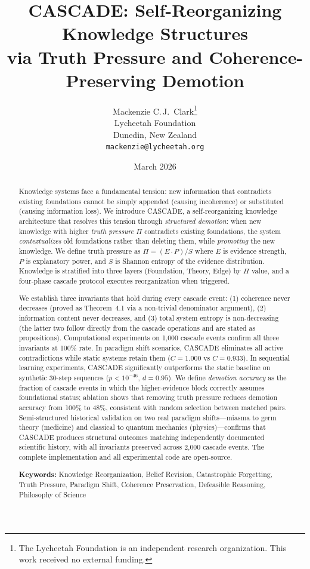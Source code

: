 \documentclass[11pt,a4paper]{article}
\title{%
CASCADE: Self-Reorganizing Knowledge Structures\\
via Truth Pressure and Coherence-Preserving Demotion}
\author{%
Mackenzie C.\,J.~Clark\thanks{The Lycheetah Foundation is an independent research organization. This work received no external funding.}\\
Lycheetah Foundation\\
Dunedin, New Zealand\\
\texttt{mackenzie@lycheetah.org}
}
\date{March 2026}
\theoremstyle{definition}
\newcommand{\tp}{\Pi}
\begin{document}
\maketitle

\begin{abstract}
Knowledge systems face a fundamental tension: new information that contradicts existing
foundations cannot be simply appended (causing incoherence) or substituted (causing
information loss). We introduce CASCADE, a self-reorganizing knowledge architecture
that resolves this tension through \emph{structured demotion}: when new knowledge with
higher \emph{truth pressure} $\tp$ contradicts existing foundations, the system
\emph{contextualizes} old foundations rather than deleting them, while \emph{promoting}
the new knowledge. We define truth pressure as $\tp = (E \cdot P) / S$ where $E$ is
evidence strength, $P$ is explanatory power, and $S$ is Shannon entropy of the evidence
distribution. Knowledge is stratified into three layers (Foundation, Theory, Edge)
by $\tp$ value, and a four-phase cascade protocol executes reorganization when triggered.

We establish three invariants that hold during every cascade event: (1) coherence never
decreases (proved as Theorem~4.1 via a non-trivial denominator argument), (2) information
content never decreases, and (3) total system entropy is non-decreasing (the latter two
follow directly from the cascade operations and are stated as propositions).
Computational experiments on 1{,}000 cascade events confirm all three invariants at
100\% rate. In paradigm shift scenarios, CASCADE eliminates all active contradictions
while static systems retain them ($C=1.000$ vs $C=0.933$). In sequential learning
experiments, CASCADE significantly outperforms the static baseline on synthetic
30-step sequences ($p < 10^{-46}$, $d = 0.95$). We define \emph{demotion accuracy} as
the fraction of cascade events in which the higher-evidence block correctly assumes
foundational status; ablation shows that removing truth pressure reduces demotion
accuracy from 100\% to 48\%, consistent with random selection between matched pairs.
Semi-structured historical validation on two real paradigm shifts---miasma to germ
theory (medicine) and classical to quantum mechanics (physics)---confirms that CASCADE
produces structural outcomes matching independently documented scientific history, with
all invariants preserved across 2{,}000 cascade events. The complete
implementation and all experimental code are open-source.

\medskip
\noindent\textbf{Keywords:} Knowledge Reorganization, Belief Revision, Catastrophic
Forgetting, Truth Pressure, Paradigm Shift, Coherence Preservation, Defeasible Reasoning,
Philosophy of Science
\end{abstract}
\end{document}

